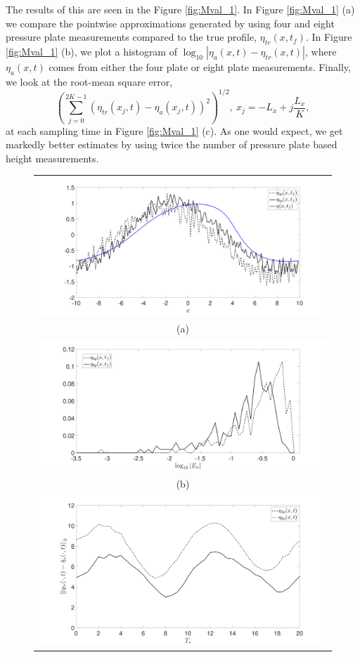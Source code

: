 The results of this are seen in the Figure \ref{fig:Mval_1}.  In Figure \ref{fig:Mval_1} (a) we compare the pointwise approximations generated by using four and eight pressure plate measurements compared to the true profile, $\eta_{tr}(x,t_{f})$.  In Figure \ref{fig:Mval_1} (b), we plot a histogram of $\log_{10}|\eta_{a}(x,t) - \eta_{tr}(x,t)|$, where $\eta_{a}(x,t)$ comes from either the four plate or eight plate measurements.  Finally, we look at the root-mean square error, 
\[
\left(\sum_{j=0}^{2K-1} \left( \eta_{tr}(x_{j},t) - \eta_{a}(x_{j},t) \right)^{2}\right)^{1/2}, ~ x_{j} = -L_{x} + j\frac{L_{x}}{K},
\]
at each sampling time in Figure \ref{fig:Mval_1} (c).  As one would expect, we get markedly better estimates by using twice the number of pressure plate based height measurements.  
\begin{figure}
\centering
\begin{tabular}{c}
\includegraphics[width=.95\textwidth]{Images/wave_tf_20_sig_pt1_4_vs8pplates_Mval_1} \\
(a)\\
\includegraphics[width=.95\textwidth]{Images/histogram_tf_20_sig_pt1_4_vs8pplates_Mval_1}\\
(b)\\
\includegraphics[width=.95\textwidth]{Images/rmserr_tf_20_sig_pt1_4_vs8pplates_Mval_1}\\

\end{tabular}
\end{figure}
